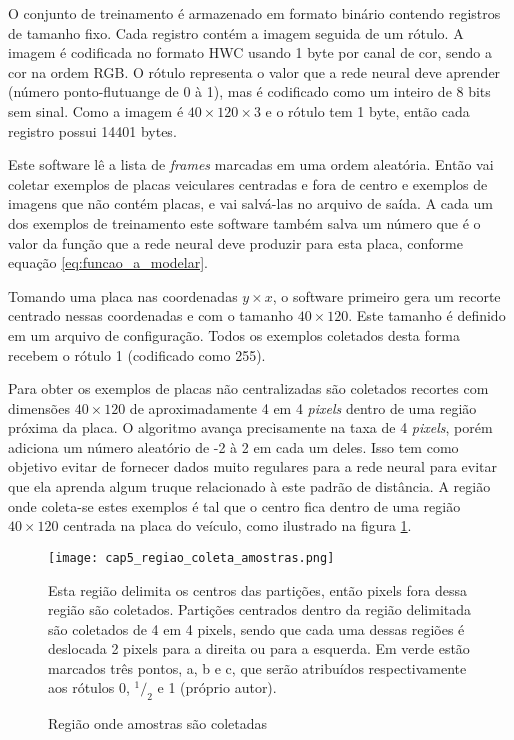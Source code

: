 O conjunto de treinamento é armazenado em formato binário contendo registros de
tamanho fixo. Cada registro contém a imagem seguida de um rótulo. A
imagem é codificada no formato HWC usando 1 byte por canal de cor,
sendo a cor na ordem RGB. O rótulo representa o valor que a rede neural
deve aprender (número ponto-flutuange de 0 à 1), mas é codificado como um
inteiro de
8 bits sem sinal.  Como a imagem é $40 \times 120 \times 3$ e o rótulo
tem 1 byte, então cada registro possui 14401 bytes.

Este software lê a lista de \emph{frames} marcadas em uma ordem
aleatória. Então vai coletar exemplos de placas veiculares centradas e fora
de centro e exemplos de imagens que não contém placas, e vai salvá-las no
arquivo de saída. A cada um dos exemplos de treinamento este software
também salva um número que é o valor da função que a rede neural deve
produzir para esta placa, conforme equação \ref{eq:funcao_a_modelar}.

Tomando uma placa nas coordenadas $y \times x$, o software primeiro gera um
recorte centrado nessas coordenadas e com o tamanho $40 \times 120$. Este
tamanho é definido em um arquivo de configuração. Todos os exemplos
coletados desta forma recebem o rótulo 1 (codificado como 255).

Para obter os exemplos de placas não centralizadas são coletados recortes
com dimensões $40 \times 120$ de
aproximadamente 4 em 4 \emph{pixels} dentro de uma região próxima da placa. O
algoritmo avança precisamente na taxa de 4 \emph{pixels}, porém adiciona um
número aleatório de -2 à 2 em cada um deles. Isso tem como objetivo evitar de
fornecer dados muito regulares para a rede neural para evitar que ela
aprenda algum truque relacionado à este padrão de distância. A região onde
coleta-se estes exemplos é tal que o centro fica dentro de uma região
$40 \times 120$ centrada na placa do veículo, como ilustrado na figura
\ref{fig:cap5_regiao_coleta_amostras}.

\begin{figure}[!htb]
	\centering
	\texttt{[image: cap5\_regiao\_coleta\_amostras.png]}
	\caption{Região onde amostras são coletadas}
	\label{fig:cap5_regiao_coleta_amostras}
	Esta região delimita os centros das partições, então pixels fora dessa
	região são coletados. Partições centrados dentro da região delimitada são
	coletados de 4 em 4 pixels, sendo que cada uma dessas regiões é deslocada 2
	pixels para a direita ou para a esquerda. Em verde estão marcados três
	pontos, a, b e c, que serão atribuídos respectivamente aos rótulos 0,
	$^1/_2$ e 1 (próprio autor).
\end{figure}

